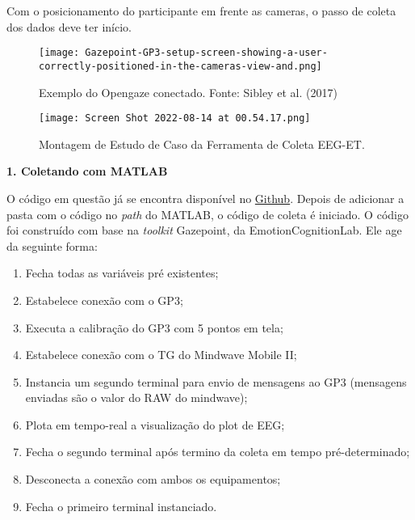 Com o posicionamento do participante em frente as cameras, o passo de coleta dos dados deve ter início. 

\begin{figure}[!h]
    \texttt{[image: Gazepoint-GP3-setup-screen-showing-a-user-correctly-positioned-in-the-cameras-view-and.png]}
    \caption{Exemplo do Opengaze conectado. Fonte: Sibley et al. (2017)}
\end{figure}



\begin{figure}
    \centering
    \texttt{[image: Screen Shot 2022-08-14 at 00.54.17.png]}
    \caption{Montagem de Estudo de Caso da Ferramenta de Coleta EEG-ET.}
\end{figure}







\textbf{1. Coletando com MATLAB}

O código em questão já se encontra disponível no \href{https://github.com/anapaulasandes/ppgeb_masters}{Github}.
Depois de adicionar a pasta com o código no \textit{path} do MATLAB, o código de coleta é
iniciado. O código foi construído com base na \textit{toolkit} Gazepoint, da EmotionCognitionLab. 
Ele age da seguinte forma:

\begin{enumerate}
    \item Fecha todas as variáveis pré existentes;
    \item Estabelece conexão com o GP3;
    \item Executa a calibração do GP3 com 5 pontos em tela;
    \item Estabelece conexão com o TG do Mindwave Mobile II;
    \item Instancia um segundo terminal para envio de mensagens ao GP3 (mensagens enviadas são o valor do RAW do mindwave);
    \item Plota em tempo-real a visualização do plot de EEG;
    \item Fecha o segundo terminal após termino da coleta em tempo pré-determinado;
    \item Desconecta a conexão com ambos os equipamentos;
    \item Fecha o primeiro terminal instanciado.
\end{enumerate}

